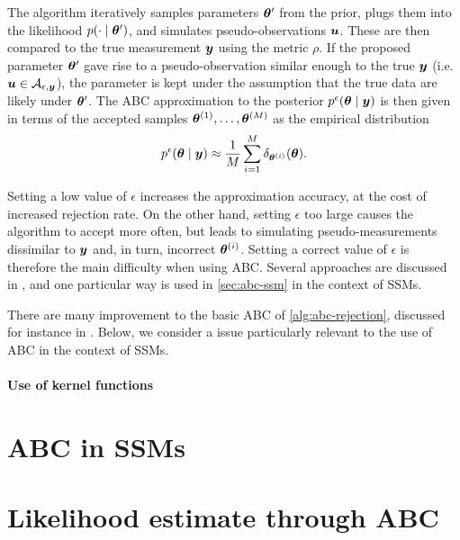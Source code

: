 The algorithm iteratively samples parameters $\bm{\theta}^\prime$ from the prior, plugs them into the likelihood $p(\cdot \mid \bm{\theta}^\prime)$, and simulates pseudo-observations $\bm{u}$. These are then compared to the true measurement $\bm{y}$ using the metric $\rho$. If the proposed parameter $\bm{\theta}^\prime$ gave rise to a pseudo-observation similar enough to the true $\bm{y}$ (i.e. $\bm{u} \in \mathcal{A}_{\epsilon, \bm{y}}$), the parameter is kept under the assumption that the true data are likely under $\bm{\theta}^\prime$. The ABC approximation to the posterior $p^\epsilon(\bm{\theta} \mid \bm{y})$ is then given in terms of the accepted samples $\bm{\theta}^{(1)}, \ldots, \bm{\theta}^{(M)}$ as the empirical distribution
\begin{equation*}
p^\epsilon(\bm{\theta} \mid \bm{y}) \approx \frac{1}{M} \sum_{i=1}^M \delta_{\bm{\theta}^{(i)}}(\bm{\theta}).
\end{equation*}

Setting a low value of $\epsilon$ increases the approximation accuracy, at the cost of increased rejection rate. On the other hand, setting $\epsilon$ too large causes the algorithm to accept more often, but leads to simulating pseudo-measurements dissimilar to $\bm{y}$ and, in turn, incorrect $\bm{\theta}^{(i)}$. Setting a correct value of $\epsilon$ is therefore the main difficulty when using ABC. Several approaches are discussed in \cite{jasra-filtering, jasra-time-series}, and one particular way \citep{dedecius} is used in \autoref{sec:abc-ssm} in the context of SSMs.

There are many improvement to the basic ABC of \autoref{alg:abc-rejection}, discussed for instance in \cite{abc-recent}. Below, we consider a issue particularly relevant to the use of ABC in the context of SSMs.

\paragraph{Use of kernel functions}

\section{ABC in SSMs} \label{sec:abc-ssm}


\section{Likelihood estimate through ABC} \label{sec:abcmh}